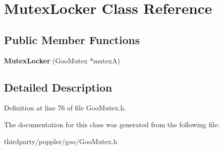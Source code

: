 \hypertarget{class_mutex_locker}{}\section{Mutex\+Locker Class Reference}
\label{class_mutex_locker}
\subsection*{Public Member Functions}
\begin{DoxyCompactItemize}
\item 
\mbox{\label{class_mutex_locker_a8f6852acc36575886a5bb00d025c2113}} 
{\bfseries Mutex\+Locker} (Goo\+Mutex $\ast$mutexA)
\end{DoxyCompactItemize}


\subsection{Detailed Description}


Definition at line 76 of file Goo\+Mutex.\+h.



The documentation for this class was generated from the following file\+:\begin{DoxyCompactItemize}
\item 
thirdparty/poppler/goo/Goo\+Mutex.\+h\end{DoxyCompactItemize}
